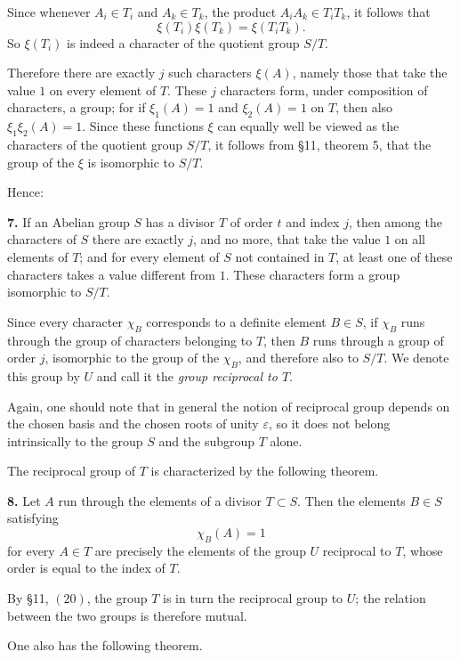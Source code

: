 \documentclass[11pt]{article}
\begin{document}
Since whenever \(A_i\in T_i\) and \(A_k\in T_k\), the product \(A_iA_k\in T_iT_k\), it follows that
\[
\xi(T_i)\xi(T_k)=\xi(T_iT_k).
\tag{6}
\]
So \(\xi(T_i)\) is indeed a character of the quotient group \(S/T\).

Therefore there are exactly \(j\) such characters \(\xi(A)\), namely those that take the value \(1\) on every element of \(T\). These \(j\) characters form, under composition of characters, a group; for if \(\xi_1(A)=1\) and \(\xi_2(A)=1\) on \(T\), then also \(\xi_1\xi_2(A)=1\). Since these functions \(\xi\) can equally well be viewed as the characters of the quotient group \(S/T\), it follows from \S 11, theorem 5, that the group of the \(\xi\) is isomorphic to \(S/T\).

Hence:

\medskip
\noindent\textbf{7.} If an Abelian group \(S\) has a divisor \(T\) of order \(t\) and index \(j\), then among the characters of \(S\) there are exactly \(j\), and no more, that take the value \(1\) on all elements of \(T\); and for every element of \(S\) not contained in \(T\), at least one of these characters takes a value different from \(1\). These characters form a group isomorphic to \(S/T\).

\medskip
Since every character \(\chi_B\) corresponds to a definite element \(B\in S\), if \(\chi_B\) runs through the group of characters belonging to \(T\), then \(B\) runs through a group of order \(j\), isomorphic to the group of the \(\chi_B\), and therefore also to \(S/T\). We denote this group by \(U\) and call it the \emph{group reciprocal to \(T\)}.

Again, one should note that in general the notion of reciprocal group depends on the chosen basis and the chosen roots of unity \(\varepsilon\), so it does not belong intrinsically to the group \(S\) and the subgroup \(T\) alone.

The reciprocal group of \(T\) is characterized by the following theorem.

\medskip
\noindent\textbf{8.} Let \(A\) run through the elements of a divisor \(T\subset S\). Then the elements \(B\in S\) satisfying
\[
\chi_B(A)=1
\tag{7}
\]
for every \(A\in T\) are precisely the elements of the group \(U\) reciprocal to \(T\), whose order is equal to the index of \(T\).

\medskip
By \S 11, \((20)\), the group \(T\) is in turn the reciprocal group to \(U\); the relation between the two groups is therefore mutual.

One also has the following theorem.
\end{document}
